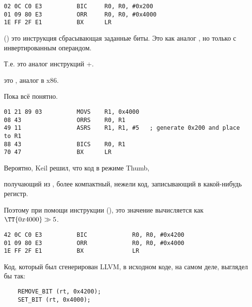 
\begin{lstlisting}[caption=\OptimizingKeilVI (\ARMMode)]
02 0C C0 E3          BIC     R0, R0, #0x200
01 09 80 E3          ORR     R0, R0, #0x4000
1E FF 2F E1          BX      LR
\end{lstlisting}

 () это инструкция сбрасывающая заданные биты. 
Это как аналог \AND, но только с инвертированным операндом.

Т.е. это аналог инструкций \NOT+\AND.

 это , аналог \OR в x86.

Пока всё понятно.


\begin{lstlisting}[caption=\OptimizingKeilVI (\ThumbMode)]
01 21 89 03          MOVS    R1, 0x4000
08 43                ORRS    R0, R1
49 11                ASRS    R1, R1, #5   ; generate 0x200 and place to R1
88 43                BICS    R0, R1
70 47                BX      LR
\end{lstlisting}

Вероятно, Keil решил, что код в режиме Thumb,

получающий  из , 
более компактный, нежели код, 
записывающий  в какой-нибудь регистр.

Поэтому при помощи инструкции  (\ASRdesc), это значение вычисляется как $\TT{0x4000} \gg 5$.

\label{anomaly:LLVM}
\myindex{\CompilerAnomaly}

\begin{lstlisting}[caption=\OptimizingXcodeIV (\ARMMode),label=ARM_leaf_example3]
42 0C C0 E3          BIC             R0, R0, #0x4200
01 09 80 E3          ORR             R0, R0, #0x4000
1E FF 2F E1          BX              LR
\end{lstlisting}

Код, который был сгенерирован LLVM, в исходном коде, на самом деле, выглядел бы так:

\begin{lstlisting}
    REMOVE_BIT (rt, 0x4200);
    SET_BIT (rt, 0x4000);
\end{lstlisting}


